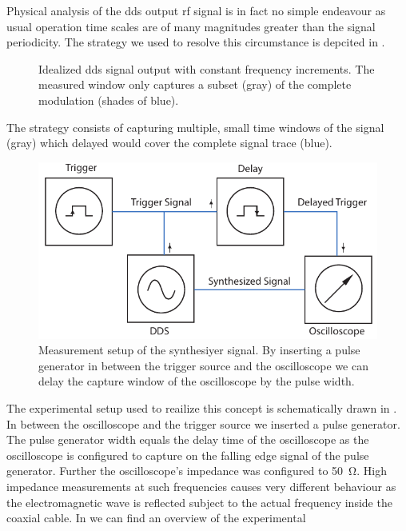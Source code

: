 Physical analysis of the \gls{dds} output \gls{rf} signal is in fact no simple
endeavour as usual operation time scales are of many magnitudes greater than
the signal periodicity. The strategy we used to resolve this circumstance is
depcited in .
\begin{figure}[htb]
  \centering
  \begin{adjustbox}{width=\textwidth}
    
  \end{adjustbox}
  \caption{Idealized \gls{dds} signal output with constant frequency
    increments. The measured window only captures a subset (gray) of the complete
    modulation (shades of blue).}\label{fig:signal_window}
\end{figure}
The strategy consists of capturing multiple, small time windows of the signal
(gray) which delayed would cover the complete signal trace (blue).
\begin{figure}[htb]
  \centering
  \includegraphics[width=.8\textwidth]{../figure/signal/setup-dds.pdf}
  \caption{Measurement setup of the synthesiyer signal. By inserting a pulse
    generator in between the trigger source and the oscilloscope we can delay
    the capture window of the oscilloscope by the pulse width.
  }\label{fig:signal_window_setup}
\end{figure}
The experimental setup used to reailize this concept is schematically drawn in
. In between the oscilloscope and the trigger
source we inserted a pulse generator. The pulse generator width equals the
delay time of the oscilloscope as the oscilloscope is configured to capture
on the falling edge signal of the pulse generator. Further the oscilloscope's
impedance was configured to \SI{50}{\ohm}. High impedance measurements at
such frequencies causes very different behaviour as the electromagnetic wave
is reflected subject to the actual frequency inside the coaxial cable. In 
 we can find an overview of the experimental
